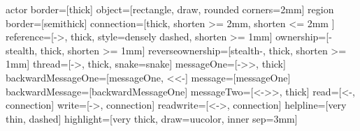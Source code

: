 \usepackage{xcolor}




\newcommand{\colorpalette}{
  \begin{tikzpicture}
    \coordinate (last) at (0,0);
    \foreach \letter in {A,B,C,D,E} {
      \node[circle,fill=color\letter, label=above:color\letter] at ($(last) + (3,0)$) (last) {};
      \node[circle,fill=dark\letter, label=above:dark\letter] at ($(last) - (0,1)$) {};
      \node[circle,fill=verydark\letter, label=above:verydark\letter] at ($(last) - (0,2)$) {};
    }
  \end{tikzpicture}
}


\usetikzlibrary{snakes,arrows,calc,fit}
\tikzstyle actor border=[thick]
\tikzstyle object=[rectangle, draw, rounded corners=2mm]
\tikzstyle region border=[semithick]
\tikzstyle connection=[thick, shorten >= 2mm, shorten <= 2mm ]
\tikzstyle reference=[->, thick, style=densely dashed, shorten >= 1mm]
\tikzstyle ownership=[-stealth, thick, shorten >= 1mm]
\tikzstyle reverseownership=[stealth-, thick, shorten >= 1mm]
\tikzstyle thread=[->, thick, snake=snake]
\tikzstyle messageOne=[->>, thick]
\tikzstyle backwardMessageOne=[messageOne, <<-]
\tikzstyle message=[messageOne]
\tikzstyle backwardMessage=[backwardMessageOne]
\tikzstyle messageTwo=[<->>, thick]
\tikzstyle read=[<-, connection]
\tikzstyle write=[->, connection]
\tikzstyle readwrite=[<->, connection]
\tikzstyle helpline=[very thin, dashed]
\tikzstyle highlight=[very thick, draw=uucolor, inner sep=3mm]


